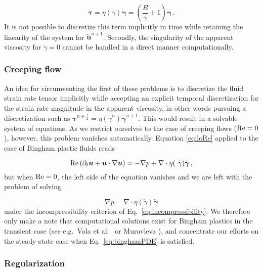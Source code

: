 \documentclass[final,3p,twocolumn]{elsarticle}
\begin{document}
\begin{equation} 
    \bm{\tau} = \eta(\dot{\gamma}) \bm{\dot{\gamma}} = \left(
    \frac{B}{\dot{\gamma}} + 1 \right) \dot{\bm{\gamma}} \,.
    \label{eq:binghamStress}
\end{equation}
%
It is not possible to discretize this term implicitly in time while retaining
the linearity of the system for $\tilde{\bm{u}}^{n+1}$. Secondly, the
singularity of the apparent viscosity for $\dot{\gamma}=0$ cannot be handled
in a direct manner computationally. 

\subsubsection{Creeping flow}

An idea for circumventing the first of these problems is to discretize the
fluid strain rate tensor implicitly while accepting an explicit temporal
discretization for the strain rate magnitude in the apparent viscosity, in
other words pursuing a discretization such as $\bm{\tau}^{n+\frac{1}{2}} =
\eta(\dot{\gamma}^{n}) \dot{\bm{\gamma}}^{n+1}$. This would result in a
solvable system of equations. As we restrict ourselves to the case of creeping
flows (${\rm Re}=0$), however, this problem vanishes automatically. Equation
\eqref{eq:loRe} applied to the case of Bingham plastic fluids reads 

\begin{equation}
    {\rm Re} \left( \partial_t \bm{u} + \bm{u} \cdot \nabla \bm{u} \right)  = -
    \nabla p + \nabla \cdot \eta ( \dot{\gamma} ) \dot{\bm{\gamma}} \,,
\end{equation}
%
but when ${\rm Re} = 0$, the left side of the equation vanishes and we are left
with the problem of solving 

\begin{equation}
    \nabla p = \nabla \cdot \eta ( \dot{\gamma} ) \dot{\bm{\gamma}} 
    \label{eq:binghamPDE}
\end{equation}
%
under the incompressibility criterion of Eq.\ \eqref{eq:incompressibility}. We
therefore only make a note that computational solutions exist for Bingham
plastics in the transient case (see e.g.\ Vola et al.\
\cite{vola2003laminar} or Muravleva \cite{muravleva2015uzawa}), and concentrate
our efforts on the steady-state case when Eq.\ \eqref{eq:binghamPDE} is
satisfied.

\subsubsection{Regularization}
\end{document}
